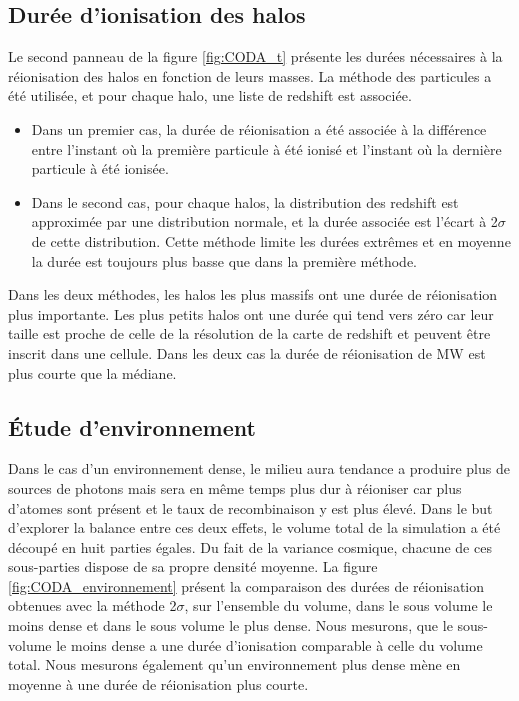 \subsection{Durée d'ionisation des halos}
Le second panneau de la figure \ref{fig:CODA_t} présente les durées nécessaires à la réionisation des halos en fonction de leurs masses.
La méthode des particules a été utilisée, et pour chaque halo, une liste de redshift est associée.
\begin{itemize}
\item Dans un premier cas, la durée de réionisation a été associée à la différence entre l'instant où la première particule à été ionisé et l'instant où la dernière particule à été ionisée.
\item Dans le second cas, pour chaque halos, la distribution des redshift est approximée par une distribution normale, et la durée associée est l'écart à 2$\sigma$ de cette distribution.
Cette méthode limite les durées extrêmes et en moyenne la durée est toujours plus basse que dans la première méthode.
\end{itemize}

Dans les deux méthodes, les halos les plus massifs ont une durée de réionisation plus importante. 
Les plus petits halos ont une durée qui tend vers zéro car leur taille est proche de celle de la résolution de la carte de redshift et peuvent être inscrit dans une cellule.
Dans les deux cas la durée de réionisation de MW est plus courte que la médiane.





\subsection{Étude d’environnement}

Dans le cas d'un environnement dense, le milieu aura tendance a produire plus de sources de photons mais sera en même temps plus dur à réioniser car plus d'atomes sont présent et le taux de recombinaison y est plus élevé. %
Dans le but d'explorer la balance entre ces deux effets, le volume total de la simulation a été découpé en huit parties égales.
Du fait de la variance cosmique, chacune de ces sous-parties dispose de sa propre densité moyenne.
La figure \ref{fig:CODA_environnement} présent la comparaison des durées de réionisation obtenues avec la méthode 2$\sigma$, sur l'ensemble du volume, dans le sous volume le moins dense et dans le sous volume le plus dense.
Nous mesurons, que le sous-volume le moins dense a une durée d'ionisation comparable à celle du volume total.
Nous mesurons également qu'un environnement plus dense mène en moyenne à une durée de réionisation plus courte.%

